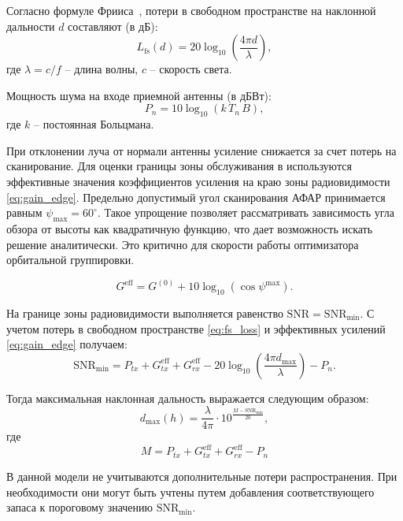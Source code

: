 Согласно формуле Фрииса~\cite{friis1946}, потери в свободном
пространстве на наклонной дальности $d$ составляют (в дБ):
\begin{equation}\label{eq:fs_loss}
L_{\text{fs}}(d) = 20\log_{10}\!\left(\frac{4\pi d}{\lambda}\right),
\end{equation}
где $\lambda = c/f$ -- длина волны, $c$ -- скорость света.

Мощность шума на входе приемной антенны (в дБВт):
\begin{equation}
P_{n} = 10\log_{10}(k\,T_n\,B),
\end{equation}
где $k$ -- постоянная Больцмана.

При отклонении луча от нормали антенны усиление снижается за 
счет потерь на сканирование. Для
оценки границы зоны обслуживания в используются
эффективные значения коэффициентов усиления на краю зоны
радиовидимости \ref{eq:gain_edge}. 
Предельно допустимый угол сканирования АФАР
принимается равным $\psi_{\max} = 60^\circ$. 
Такое упрощение позволяет рассматривать зависимость угла обзора 
от высоты как квадратичную функцию, что дает возможность искать 
решение аналитически. Это критично для скорости работы оптимизатора 
орбитальной группировки.

\begin{equation}\label{eq:gain_edge}
G^{\text{eff}} = G^{(0)} + 10\log_{10}(\cos \psi^{\max}).
\end{equation}

На границе зоны радиовидимости выполняется равенство $\mathrm{SNR} =
\mathrm{SNR}_{\min}$. С учетом потерь в свободном пространстве \ref{eq:fs_loss} и
эффективных усилений \ref{eq:gain_edge} получаем:
\begin{equation}
\mathrm{SNR}_{\min} = P_{tx} + G_{tx}^{\text{eff}} + G_{rx}^{\text{eff}}
- 20\log_{10}\!\left(\frac{4\pi d_{\max}}{\lambda}\right) - P_{n}.
\end{equation}

Тогда максимальная наклонная дальность выражается следующим образом:
\begin{equation}
 d_{\max}(h) = \frac{\lambda}{4\pi} \cdot 10^{\frac{M -
 \mathrm{SNR}_{\min}}{20}},
\end{equation}
где
\begin{equation}
M = P_{tx} + G_{tx}^{\text{eff}} + G_{rx}^{\text{eff}} - P_{n}
\end{equation}

В данной модели не учитываются дополнительные потери 
распространения. При необходимости они могут быть учтены 
путем добавления соответствующего запаса к пороговому значению \(\mathrm{SNR}_{\min}\).

